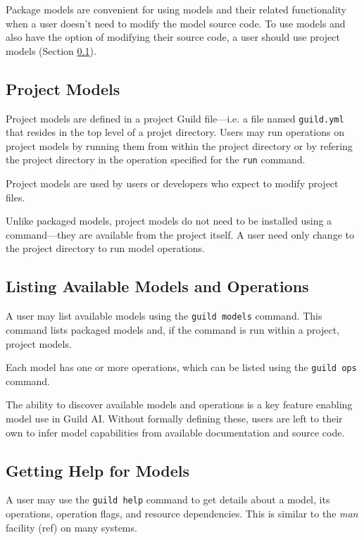 \documentclass{article}
\begin{document}
Package models are convenient for using models and their related
functionality when a user doesn't need to modify the model source
code. To use models and also have the option of modifying their source
code, a user should use project models (Section
\ref{sec:project-models}).

\subsection{Project Models}
\label{sec:project-models}

Project models are defined in a project Guild file---i.e. a file named
\verb|guild.yml| that resides in the top level of a projet
directory. Users may run operations on project models by running them
from within the project directory or by refering the project directory
in the operation specified for the \verb|run| command.

Project models are used by users or developers who expect to modify
project files.

Unlike packaged models, project models do not need to be installed
using a command---they are available from the project itself. A user
need only change to the project directory to run model operations.

\subsection{Listing Available Models and Operations}

A user may list available models using the \verb|guild models|
command. This command lists packaged models and, if the command is run
within a project, project models.

Each model has one or more operations, which can be listed using the
\verb|guild ops| command.

The ability to discover available models and operations is a key
feature enabling model use in Guild AI. Without formally defining
these, users are left to their own to infer model capabilities from
available documentation and source code.

\subsection{Getting Help for Models}

A user may use the \verb|guild help| command to get details about a
model, its operations, operation flags, and resource
dependencies. This is similar to the \emph{man} facility (ref) on many
systems.
\end{document}

